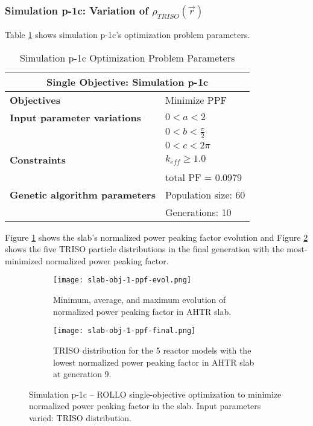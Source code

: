 \subsubsection{Simulation p-1c: Variation of $\rho_{TRISO}(\vec{r})$}
Table \ref{tab:simulationp1c} shows simulation p-1c's optimization problem parameters. 
\begin{table}[htbp!]
    \centering
    \onehalfspacing
    \caption{Simulation p-1c Optimization Problem Parameters}
	\label{tab:simulationp1c}
    \footnotesize
    \begin{tabular}{l|p{3cm}}
    \hline 
    \multicolumn{2}{c}{\textbf{Single Objective: Simulation p-1c}} \\
    \hline 
    \textbf{Objectives} & Minimize PPF \\
    \hline 
    \textbf{Input parameter variations} & $0<a<2$ \\
    & $0<b<\frac{\pi}{2}$ \\
    & $0<c<2\pi$ \\
    \hline
    \textbf{Constraints} & $k_{eff} \geq 1.0$\\ 
    & total PF = 0.0979\\
    \hline 
    \textbf{Genetic algorithm parameters} & Population size: 60 \\
    & Generations: 10 \\
    \hline
    \end{tabular}
\end{table}
Figure \ref{fig:slab-obj-1-ppf-evol} shows the slab's normalized power peaking 
factor evolution and Figure \ref{fig:slab-obj-1-ppf-final} shows the five TRISO particle 
distributions in the final generation with the most-minimized normalized power peaking 
factor.
\begin{figure}[htbp!]
    \centering
    \begin{subfigure}{\textwidth}
        \texttt{[image: slab-obj-1-ppf-evol.png]}
        \caption{Minimum, average, and maximum evolution of normalized power 
        peaking factor in AHTR slab.}
        \label{fig:slab-obj-1-ppf-evol} 
    \end{subfigure}
    \begin{subfigure}{\textwidth}
        \texttt{[image: slab-obj-1-ppf-final.png]}
        \caption{TRISO distribution for the 5 reactor models with the 
        lowest normalized power peaking factor in AHTR slab at generation 9.}
        \label{fig:slab-obj-1-ppf-final} 
    \end{subfigure}
    \caption{Simulation p-1c -- ROLLO single-objective optimization to minimize normalized power 
    peaking factor in the slab. Input parameters varied: TRISO distribution.}
    \label{fig:slab-obj-1-ppf}
\end{figure}

